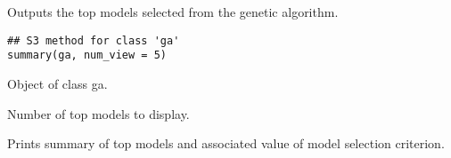 %
\begin{Description}\relax
Outputs the top models selected from the genetic algorithm.
\end{Description}
%
\begin{Usage}
\begin{verbatim}
## S3 method for class 'ga'
summary(ga, num_view = 5)
\end{verbatim}
\end{Usage}
%
\begin{Arguments}
\begin{ldescription}
\item[\code{ga}] Object of class ga.

\item[\code{num\_view}] Number of top models to display.
\end{ldescription}
\end{Arguments}
%
\begin{Value}
Prints summary of top models and associated value of
model selection criterion.
\end{Value}
